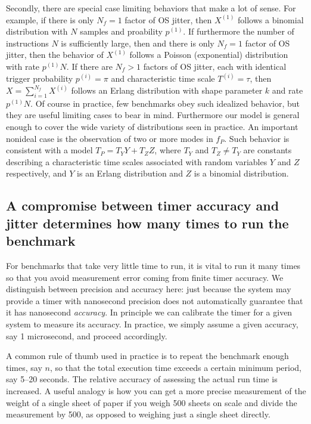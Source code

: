 \documentclass[conference]{IEEEtran}
\begin{document}
Secondly, there are special case limiting behaviors that make a lot of sense. For example, if there is only $N_f = 1$ factor of OS jitter, then $X^{(1)}$ follows a binomial distribution with $N$ samples and proability $p^{(1)}$. If furthermore the number of instructions $N$ is sufficiently large, then and there is only $N_f = 1$ factor of OS jitter, then the behavior of $X^{(1)}$ follows a Poisson (exponential) distribution with rate $p^{(1)} N$. If there are $N_f > 1$ factors of OS jitter, each with identical trigger probability $p^{(i)} = \pi$ and characteristic time scale $T^(i) = \tau$, then $X = \sum_{i=1}^{N_f} X^{(i)}$ follows an Erlang distribution with shape parameter $k$ and rate $p^{(1)} N$. Of course in practice, few benchmarks obey such idealized behavior, but they are useful limiting cases to bear in mind. Furthermore our model is general enough to cover the wide variety of distributions seen in practice. An important nonideal case is the observation of two or more modes in $f_P$. Such behavior is consistent with a model $T_P = T_Y Y + T_Z Z$, where $T_Y$ and $T_Z \ne T_Y$ are constants describing a characteristic time scales associated with random variables $Y$ and $Z$ respectively, and $Y$ is an Erlang distribution and $Z$ is a binomial distribution.



\subsection{A compromise between timer accuracy and jitter determines how many times to run the benchmark}

For benchmarks that take very little time to run, it is vital to run it many times so that you avoid measurement error coming from finite timer accuracy. We distinguish between precision and accuracy here: just because the system may provide a timer with nanosecond precision does not automatically guarantee that it has nanosecond \textit{accuracy}. In principle we can calibrate the timer for a given system to measure its accuracy. In practice, we simply assume a given accuracy, say 1 microsecond, and proceed accordingly.

A common rule of thumb used in practice is to repeat the benchmark enough times, say $n$, so that the total execution time exceeds a certain minimum period, say 5--20 seconds. The relative accuracy of assessing the actual run time is increased. A useful analogy is how you can get a more precise measurement of the weight of a single sheet of paper if you weigh 500 sheets on scale and divide the measurement by 500, as opposed to weighing just a single sheet directly.
\end{document}
